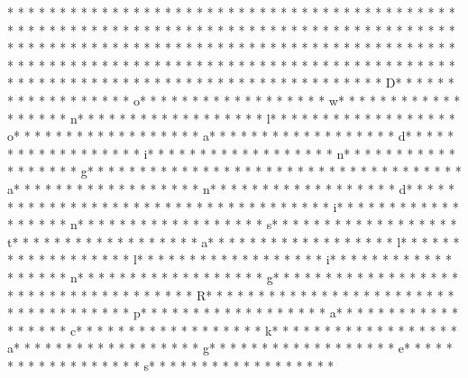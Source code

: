 * * *  * * *  * * *  *  * * *  *  * * *  * 	* * *  * * *  * * *  *  * * *  *  * * *  * 	* * *  * * *  * * *  *  * * *  *  * * *  * * *  * * *  *  * * *  *  * * *  * * *  * * *  *  * * *  *  * * *  *  * * *  * * *  * * *  *  * * *  *  * * *  *  * * *  * * *  * * *  *  * * *  *  * * *  *  * * *  * * *  * * *  *  * * *  *  * * *  *  * * *  * * *  * * *  *  * * *  *  * * *  *  * * *  * * *  * * *  *  * * *  *  * * *  *  * * *  * * *  * * *  *  * * *  *  * * *  *  * * *  * * *  * * *  *  * * *  *  * * *  * D* * *  * * *  * * *  *  * * *  *  * * *  * o* * *  * * *  * * *  *  * * *  *  * * *  * w* * *  * * *  * * *  *  * * *  *  * * *  * n* * *  * * *  * * *  *  * * *  *  * * *  * l* * *  * * *  * * *  *  * * *  *  * * *  * o* * *  * * *  * * *  *  * * *  *  * * *  * a* * *  * * *  * * *  *  * * *  *  * * *  * d* * *  * * *  * * *  *  * * *  *  * * *  * i* * *  * * *  * * *  *  * * *  *  * * *  * n* * *  * * *  * * *  *  * * *  *  * * *  * g* * *  * * *  * * *  *  * * *  *  * * *  *  * * *  * * *  * * *  *  * * *  *  * * *  * a* * *  * * *  * * *  *  * * *  *  * * *  * n* * *  * * *  * * *  *  * * *  *  * * *  * d* * *  * * *  * * *  *  * * *  *  * * *  *  * * *  * * *  * * *  *  * * *  *  * * *  * i* * *  * * *  * * *  *  * * *  *  * * *  * n* * *  * * *  * * *  *  * * *  *  * * *  * s* * *  * * *  * * *  *  * * *  *  * * *  * t* * *  * * *  * * *  *  * * *  *  * * *  * a* * *  * * *  * * *  *  * * *  *  * * *  * l* * *  * * *  * * *  *  * * *  *  * * *  * l* * *  * * *  * * *  *  * * *  *  * * *  * i* * *  * * *  * * *  *  * * *  *  * * *  * n* * *  * * *  * * *  *  * * *  *  * * *  * g* * *  * * *  * * *  *  * * *  *  * * *  *  * * *  * * *  * * *  *  * * *  *  * * *  * R* * *  * * *  * * *  *  * * *  *  * * *  *  * * *  * * *  * * *  *  * * *  *  * * *  * p* * *  * * *  * * *  *  * * *  *  * * *  * a* * *  * * *  * * *  *  * * *  *  * * *  * c* * *  * * *  * * *  *  * * *  *  * * *  * k* * *  * * *  * * *  *  * * *  *  * * *  * a* * *  * * *  * * *  *  * * *  *  * * *  * g* * *  * * *  * * *  *  * * *  *  * * *  * e* * *  * * *  * * *  *  * * *  *  * * *  * s* * *  * * *  * * *  *  * * *  *  * * *  * 
